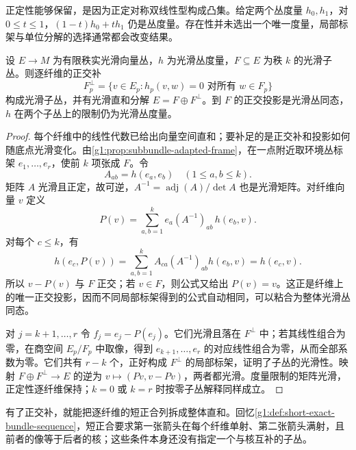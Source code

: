 正定性能够保留，是因为正定对称双线性型构成凸集。给定两个丛度量 \(h_0,h_1\)，对 \(0\le t\le1\)，\((1-t)h_0+th_1\) 仍是丛度量。存在性并未选出一个唯一度量，局部标架与单位分解的选择通常都会改变结果。

\begin{proposition}\label{g1:prop:orthogonal-complement-bundle}
	设 \(E\to M\) 为有限秩实光滑向量丛，\(h\) 为光滑丛度量，\(F\subseteq E\) 为秩 \(k\) 的光滑子丛。则逐纤维的正交补
	\[
		F^\perp_p=\{v\in E_p:h_p(v,w)=0\text{ 对所有 }w\in F_p\}
	\]
	构成光滑子丛，并有光滑直和分解 \(E=F\oplus F^\perp\)。到 \(F\) 的正交投影是光滑丛同态，\(h\) 在两个子丛上的限制仍为光滑丛度量。
\end{proposition}
\begin{proof}
	每个纤维中的线性代数已给出向量空间直和；要补足的是正交补和投影如何随底点光滑变化。由\cref{g1:prop:subbundle-adapted-frame}，在一点附近取环境丛标架 \(e_1,\ldots,e_r\)，使前 \(k\) 项张成 \(F\)。令
	\[
		A_{ab}=h(e_a,e_b)\quad(1\le a,b\le k).
	\]
	矩阵 \(A\) 光滑且正定，故可逆，\(A^{-1}=\operatorname{adj}(A)/\det A\) 也是光滑矩阵。对纤维向量 \(v\) 定义
	\[
		P(v)=\sum_{a,b=1}^k e_a(A^{-1})_{ab}\,h(e_b,v).
	\]
	对每个 \(c\le k\)，有
	\[
		h(e_c,P(v))=\sum_{a,b=1}^k A_{ca}(A^{-1})_{ab}h(e_b,v)
		=h(e_c,v).
	\]
	所以 \(v-P(v)\) 与 \(F\) 正交；若 \(v\in F\)，则公式又给出 \(P(v)=v\)。这正是纤维上的唯一正交投影，因而不同局部标架得到的公式自动相同，可以粘合为整体光滑丛同态。

	对 \(j=k+1,\ldots,r\) 令 \(f_j=e_j-P(e_j)\)。它们光滑且落在 \(F^\perp\) 中；若其线性组合为零，在商空间 \(E_p/F_p\) 中取像，得到 \(e_{k+1},\ldots,e_r\) 的对应线性组合为零，从而全部系数为零。它们共有 \(r-k\) 个，正好构成 \(F^\perp\) 的局部标架，证明了子丛的光滑性。映射 \(F\oplus F^\perp\to E\) 的逆为 \(v\mapsto(Pv,v-Pv)\)，两者都光滑。度量限制的矩阵光滑，正定性逐纤维保持；\(k=0\) 或 \(k=r\) 时按零子丛解释同样成立。
\end{proof}

有了正交补，就能把逐纤维的短正合列拆成整体直和。回忆\cref{g1:def:short-exact-bundle-sequence}，短正合要求第一张箭头在每个纤维单射、第二张箭头满射，且前者的像等于后者的核；这些条件本身还没有指定一个与核互补的子丛。

